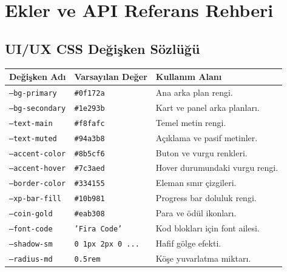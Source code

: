 \documentclass[12pt,a4paper]{article}
\begin{document}
\section{Ekler ve API Referans Rehberi}

\subsection{UI/UX CSS Değişken Sözlüğü}
\begin{longtable}{@{} P{4.5cm} P{4.5cm} P{5.5cm} @{}}
\toprule
\textbf{Değişken Adı} & \textbf{Varsayılan Değer} & \textbf{Kullanım Alanı} \\
\midrule
\texttt{--bg-primary} & \texttt{\#0f172a} & Ana arka plan rengi. \\
\texttt{--bg-secondary} & \texttt{\#1e293b} & Kart ve panel arka planları. \\
\texttt{--text-main} & \texttt{\#f8fafc} & Temel metin rengi. \\
\texttt{--text-muted} & \texttt{\#94a3b8} & Açıklama ve pasif metinler. \\
\texttt{--accent-color} & \texttt{\#8b5cf6} & Buton ve vurgu renkleri. \\
\texttt{--accent-hover} & \texttt{\#7c3aed} & Hover durumundaki vurgu rengi. \\
\texttt{--border-color} & \texttt{\#334155} & Eleman sınır çizgileri. \\
\texttt{--xp-bar-fill} & \texttt{\#10b981} & Progress bar doluluk rengi. \\
\texttt{--coin-gold} & \texttt{\#eab308} & Para ve ödül ikonları. \\
\texttt{--font-code} & \texttt{'Fira Code'} & Kod blokları için font ailesi. \\
\texttt{--shadow-sm} & \texttt{0 1px 2px 0 ...} & Hafif gölge efekti. \\
\texttt{--radius-md} & \texttt{0.5rem} & Köşe yuvarlatma miktarı. \\
\bottomrule
\end{longtable}
\end{document}
